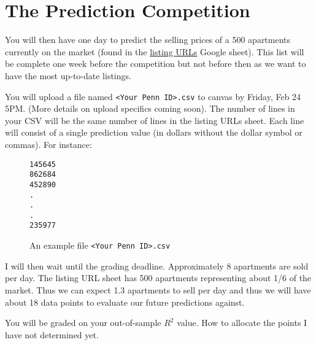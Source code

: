 \documentclass[12pt]{article}
\begin{document}
\section{The Prediction Competition}

You will then have one day to predict the selling prices of a 500 apartments currently on the market (found in the \href{https://docs.google.com/spreadsheets/d/12cOzcQlz9WCayasqB-sx_9E6gjQH0-eCuryqJUucZ50/edit#gid=0}{listing URLs} Google sheet). This list will be complete one week before the competition but not before then as we want to have the most up-to-date listings.

You will upload a file named \texttt{<Your Penn ID>.csv} to canvas by Friday, Feb 24 5PM. (More details on upload specifics coming soon). The number of lines in your CSV will be the same number of lines in the listing URLs sheet. Each line will consist of a single prediction value (in dollars without the dollar symbol or commas). For instance:

\begin{figure}[htp]
\begin{Verbatim}[frame=single, fontsize = \small]
145645
862684
452890
.
.
.
235977
\end{Verbatim}
\caption{An example file \texttt{<Your Penn ID>.csv}}
\end{figure}

I will then wait until the grading deadline. Approximately 8 apartments are sold per day. The listing URL sheet has 500 apartments representing about 1/6 of the market. Thus we can expect 1.3 apartments to sell per day and thus we will have about 18 data points to evaluate our future predictions against.

You will be graded on your out-of-sample $R^2$ value. How to allocate the points I have not determined yet.
\end{document}

